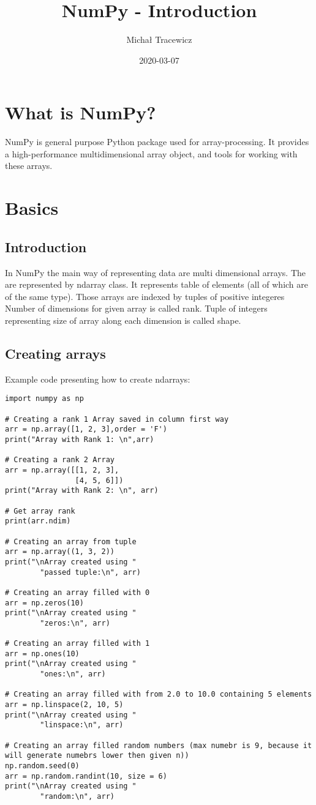 \documentclass{article}
\title{NumPy - Introduction}
\author{Michał Tracewicz}
\date{2020-03-07}
\begin{document}
\maketitle
\newpage
\tableofcontents
\newpage
{}
\section{What is NumPy?}
NumPy is general purpose Python package used for array-processing.
It provides a high-performance multidimensional array object, and tools for working with these arrays.
\section{Basics}
\subsection{Introduction}
In NumPy the main way of representing data are multi dimensional arrays.
The are represented by ndarray class. It represents table of elements (all of which are of the same type).
Those arrays are indexed by tuples of positive integeres
Number of dimensions for given array is called rank.
Tuple of integers representing size of array along each dimension is called shape.
\subsection{Creating arrays}
Example code presenting how to create ndarrays:
\begin{lstlisting}
import numpy as np

# Creating a rank 1 Array saved in column first way
arr = np.array([1, 2, 3],order = 'F')
print("Array with Rank 1: \n",arr)

# Creating a rank 2 Array
arr = np.array([[1, 2, 3],
                [4, 5, 6]])
print("Array with Rank 2: \n", arr)

# Get array rank
print(arr.ndim)

# Creating an array from tuple
arr = np.array((1, 3, 2))
print("\nArray created using "
        "passed tuple:\n", arr)

# Creating an array filled with 0
arr = np.zeros(10)
print("\nArray created using "
        "zeros:\n", arr)

# Creating an array filled with 1
arr = np.ones(10)
print("\nArray created using "
        "ones:\n", arr)

# Creating an array filled with from 2.0 to 10.0 containing 5 elements
arr = np.linspace(2, 10, 5)
print("\nArray created using "
        "linspace:\n", arr)

# Creating an array filled random numbers (max numebr is 9, because it will generate numebrs lower then given n))
np.random.seed(0)
arr = np.random.randint(10, size = 6)
print("\nArray created using "
        "random:\n", arr)
\end{lstlisting}
\end{document}

